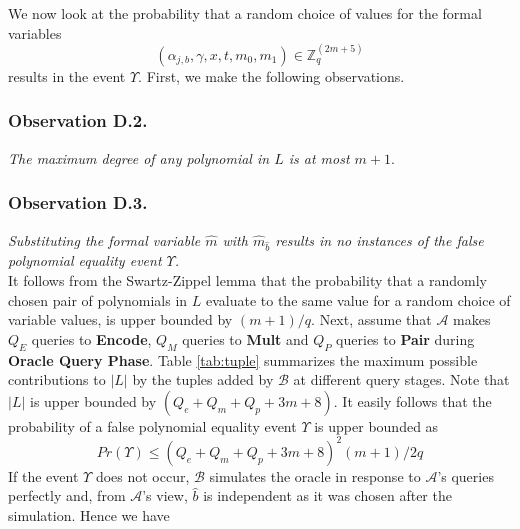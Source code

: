 We now look at the probability that a random choice of values for the formal variables
\begin{equation}
(\alpha_{j,b},\gamma,x,t,m_0,m_1)\in\mathbb{Z}^{\left(2m+5\right)}_q\nonumber
\end{equation}
\noindent results in the event $\Upsilon$. First, we make the following observations.

\subsubsection{Observation D.2.}\emph{The maximum degree of any polynomial in $L$ is at most $m+1$}.
\subsubsection{Observation D.3.}\emph{Substituting the formal variable $\hat{m}$ with $\hat{m}_{\hat{b}}$ results in no instances of the false polynomial equality event $\Upsilon$.}\\

\noindent It follows from the Swartz-Zippel lemma \cite{moshkovitz2010alternative} that the probability that a randomly chosen pair of polynomials in $L$ evaluate to the same value for a random choice of variable values, is upper bounded by $(m+1)/q$. Next, assume that $\mathcal{A}$ makes $Q_E$ queries to \textbf{Encode}, $Q_M$ queries to \textbf{Mult} and $Q_P$ queries to \textbf{Pair} during \textbf{Oracle Query Phase}. Table \ref{tab:tuple} summarizes the maximum possible contributions to $|L|$ by the tuples added by $\mathcal{B}$ at different query stages. Note that $|L|$ is upper bounded by $(Q_e+Q_m+Q_p+3m+8)$. It easily follows that the probability of a false polynomial equality event $\Upsilon$ is upper bounded as
\begin{equation}
 Pr(\Upsilon)\leq \left(Q_e+Q_m+Q_p+3m+8\right)^2\left(m+1\right)/2q\nonumber
\end{equation}
\noindent If the event $\Upsilon$ does not occur, $\mathcal{B}$ simulates the oracle in response to $\mathcal{A}$'s queries perfectly and, from $\mathcal{A}$'s view, $\hat{b}$ is independent as it was chosen after the simulation. Hence we have 

